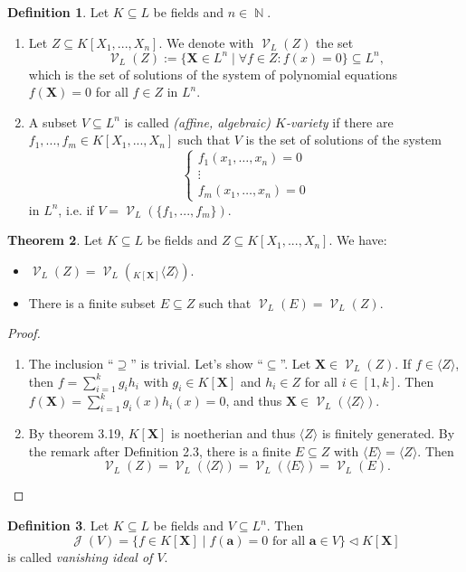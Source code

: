 \documentclass[12pt,a4paper]{report}
\theoremstyle{definition}
\newtheorem{theorem}{Theorem}[chapter] %
\newtheorem{defn}[theorem]{Definition}
\theoremstyle{num.custom-title}
\DeclareMathOperator{\J}{\mathcal{J}}
\DeclareMathOperator{\N}{\mathbb{N}}
\DeclareMathOperator{\V}{\mathcal{V}}
\DeclareMathOperator{\sse}{\subseteq}
\newcommand{\X}{\mathbf{X}}
\begin{document}
\begin{defn}
Let $K \sse L$ be fields and $n \in \N$.
\begin{enumerate}
\item Let $Z \sse K[X_1,...,X_n]$. We denote with $\V_L(Z)$ the set
\[
\V_L(Z) := \{ \X \in L^n \mid \forall f \in Z \colon f(x)=0 \}	 \sse L^n, 
\]
which is the set of solutions of the system of polynomial equations $f(\X) = 0$ for all $f \in Z$ in $L^n$.
\item A subset $V \sse L^n$ is called \emph{(affine, algebraic) $K$-variety} if there are $f_1,...,f_m \in K[X_1,...,X_n]$ such that $V$ is the set of solutions of the system
\[
\begin{cases}
f_1(x_1,\ldots,x_n)=0 \\
\vdots \\
f_m(x_1,\ldots,x_n)=0
\end{cases}
\]
in $L^n$, i.e. if $V = \V_L(\{f_1,...,f_m\})$.
\end{enumerate}
\end{defn}

\begin{theorem}
Let $K \sse L$ be fields and $Z \sse K[X_1,...,X_n]$. We have:
\begin{itemize}
\item $\V_L(Z) = \V_L( _{K[\X]} \langle Z \rangle )$.
\item There is a finite subset $E \sse Z$ such that $\V_L(E) = \V_L(Z)$.
\end{itemize}
\begin{proof}\ 
\begin{enumerate}
\item The inclusion ``$\supseteq$'' is trivial. Let's show ``$\sse$''. Let $\X \in \V_L(Z)$. If $f \in \langle Z \rangle$, then $f = \sum_{i=1}^k g_i h_i$ with $g_i \in K[\X]$ and $h_i \in Z$ for all $i \in [1,k]$. Then $f(\X) = \sum_{i=1}^k g_i(x) h_i(x) = 0$, and thus $\X \in \V_L(\langle Z \rangle)$.
\item By theorem 3.19, $K[\X]$ is noetherian and thus $\langle Z \rangle$ is finitely generated. By the remark after Definition 2.3, there is a finite $E \sse Z$ with $\langle E \rangle = \langle Z \rangle$. Then
\[
\V_L(Z) = \V_L(\langle Z \rangle) = \V_L(\langle E \rangle) = \V_L(E).
\]
\end{enumerate}
\end{proof}
\end{theorem}

\begin{defn}
Let $K \sse L$ be fields and $V \sse L^n$. Then
\[
\J(V) = \{ f \in K[\X] \mid f(\mathbf{a}) = 0 \text{ for all } \mathbf{a} \in V \} \lhd K[\X]
\]
is called \emph{vanishing ideal of $V$}.
\end{defn}
\end{document}
